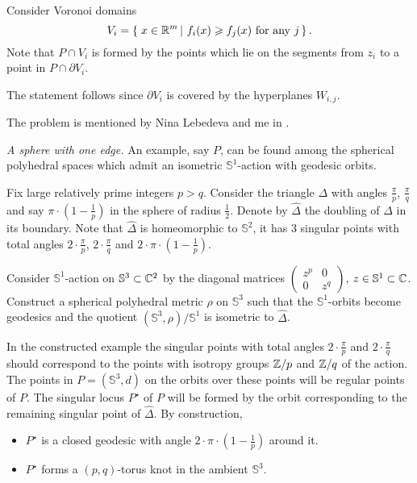 Consider Voronoi domains 
\[V_{i}=\set{x\in\RR^m}{f_i(x)\ge f_j(x) \ \text{for any}\ j}.\]
Note that $P\cap V_i$ is formed by the points which lie on the segments from $z_i$ to a point in  $P\cap \partial V_i$.

The statement follows since $\partial V_i$ is covered by the hyperplanes $W_{i,j}$.

The problem is mentioned 
by Nina Lebedeva and me in \cite{lebedeva-petrunin}.

\textit{A sphere with one edge.}
An example, say $P$, can be found among the spherical polyhedral spaces which admit
an isometric $\mathbb{S}^1$-action with geodesic orbits.

Fix large relatively prime integers $p>q$. 
Consider the triangle $\Delta$ with angles $\tfrac\pi p$, $\tfrac\pi q$ and say $\pi\cdot(1-\tfrac1 p)$ in the sphere of radius $\tfrac12$.
Denote by $\hat \Delta$ the  doubling of $\Delta$ in its boundary.
Note that $\hat \Delta$ is homeomorphic to $\mathbb S^2$,
it has 3 singular points with total angles $2\cdot\tfrac\pi p$,
$2\cdot\tfrac\pi q$ and $2\cdot\pi\cdot(1-\tfrac1 p)$.

Consider $\mathbb S^1$-action on $\mathbb S^3\subset\mathbb{C}^2$ by the diagonal matrices $\left(\begin{smallmatrix}z^p&0\\0&z^q\end{smallmatrix}\right)$, $z\in\mathbb S^1\subset\mathbb{C}$.
Construct a spherical polyhedral metric $\rho$ on  $\mathbb S^3$
such that the $\mathbb S^1$-orbits become geodesics 
and the quotient $(\mathbb S^3,\rho)/\mathbb S^1$
is isometric to $\hat \Delta$.

In the constructed example 
the singular points with total angles $2\cdot\tfrac\pi p$ and
$2\cdot\tfrac\pi q$
should correspond to the points with isotropy groups $\mathbb{Z}/p$ and $\mathbb{Z}/q$ of the action.
The points in $P=(\mathbb{S}^3,d)$ on the orbits over these points will be regular points of $P$.
The singular locus $P^\star$
of $P$ will be formed by the orbit corresponding to the remaining singular point of  $\hat \Delta$.
By construction,
\begin{itemize}
\item $P^\star$ is a closed geodesic with angle $2\cdot\pi\cdot(1-\tfrac1p)$ around it.
\item $P^\star$ forms a $(p,q)$-torus knot in the ambient $\mathbb{S}^3$.
\end{itemize}


